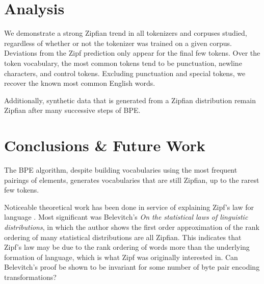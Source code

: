 \documentclass[11pt]{article}
\begin{document}
\section{Analysis}

We demonstrate a strong Zipfian trend in all tokenizers and corpuses studied, regardless of whether or not the tokenizer was trained on a given corpus. Deviations from the Zipf prediction only appear for the final few tokens. Over the token vocabulary, the most common tokens tend to be punctuation, newline characters, and control tokens. Excluding punctuation and special tokens, we recover the known most common English words. 

Additionally, synthetic data that is generated from a Zipfian distribution remain Zipfian after many successive steps of BPE. 

\section{Conclusions \& Future Work}

The BPE algorithm, despite building vocabularies using the most frequent pairings of elements, generates vocabularies that are still Zipfian, up to the rarest few tokens.

Noticeable theoretical work has been done in service of explaining Zipf's law for language \cite{li1992}. Most significant was Belevitch's \textit{On the statistical laws of linguistic distributions}\cite{Belevitch1959}, in which the author shows the first order approximation of the rank ordering of many statistical distributions are all Zipfian. This indicates that Zipf's law may be due to the rank ordering of words more than the underlying formation of language, which is what Zipf was originally interested in. Can Belevitch's proof be shown to be invariant for some number of byte pair encoding transformations?

%




\end{document}
